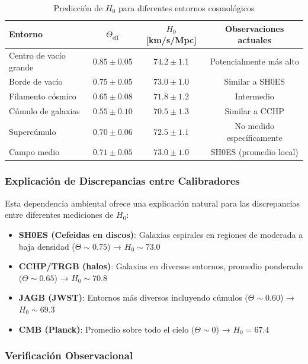 \documentclass[12pt, a4paper]{article}
\theoremstyle{plain}
\theoremstyle{definition}
\begin{document}
\begin{table}[h]
\centering
\caption{Predicción de $H_0$ para diferentes entornos cosmológicos}
\label{tab:H0_environmental}
\begin{tabular}{lccc}
\toprule
\textbf{Entorno} & $\Theta_{\mathrm{eff}}$ & $H_0$ [km/s/Mpc] & \textbf{Observaciones actuales} \\
\midrule
Centro de vacío grande & $0.85 \pm 0.05$ & $74.2 \pm 1.1$ & Potencialmente más alto \\
Borde de vacío & $0.75 \pm 0.05$ & $73.0 \pm 1.0$ & Similar a SH0ES \\
Filamento cósmico & $0.65 \pm 0.08$ & $71.8 \pm 1.2$ & Intermedio \\
Cúmulo de galaxias & $0.55 \pm 0.10$ & $70.5 \pm 1.3$ & Similar a CCHP \\
Supercúmulo & $0.70 \pm 0.06$ & $72.5 \pm 1.1$ & No medido específicamente \\
Campo medio & $0.71 \pm 0.05$ & $73.0 \pm 1.0$ & SH0ES (promedio local) \\
\bottomrule
\end{tabular}
\end{table}

\subsubsection{Explicación de Discrepancias entre Calibradores}

Esta dependencia ambiental ofrece una explicación natural para las discrepancias entre diferentes mediciones de $H_0$:

\begin{itemize}
    \item \textbf{SH0ES (Cefeidas en discos)}: Galaxias espirales en regiones de moderada a baja densidad ($\Theta \sim 0.75$) → $H_0 \sim 73.0$
    \item \textbf{CCHP/TRGB (halos)}: Galaxias en diversos entornos, promedio ponderado ($\Theta \sim 0.65$) → $H_0 \sim 70.8$
    \item \textbf{JAGB (JWST)}: Entornos más diversos incluyendo cúmulos ($\Theta \sim 0.60$) → $H_0 \sim 69.3$
    \item \textbf{CMB (Planck)}: Promedio sobre todo el cielo ($\Theta \sim 0$) → $H_0 = 67.4$
\end{itemize}

\subsubsection{Verificación Observacional}
\end{document}
